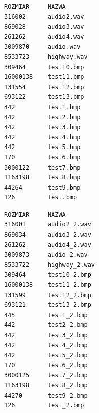 \documentclass[12pt,a4paper,notitlepage]{report}
\begin{document}
\begin{minipage}{.48\textwidth}
\begin{lstlisting}[language=bash,caption={Przedstawienie plików przed kompresją.}]
ROZMIAR		NAZWA
316002		audio2.wav
869028		audio3.wav
261262		audio4.wav
3009870		audio.wav
8533723		highway.wav
309464		test10.bmp
16000138	test11.bmp
131554		test12.bmp
693122		test13.bmp
442			test1.bmp
442			test2.bmp
442			test3.bmp
442			test4.bmp
442			test5.bmp
170			test6.bmp
3000122		test7.bmp
1163198		test8.bmp
44264		test9.bmp
126			test.bmp
\end{lstlisting}
\end{minipage}
\hfill
\begin{minipage}{.48\textwidth}
\begin{lstlisting}[language=bash,caption={Przedstawienie plików po dekompresji.}]
ROZMIAR		NAZWA
316001		audio2_2.wav
869034		audio3_2.wav
261262		audio4_2.wav
3009873		audio_2.wav
8533722		highway_2.wav
309464		test10_2.bmp
16000138	test11_2.bmp
131599		test12_2.bmp
693121		test13_2.bmp
445			test1_2.bmp
442			test2_2.bmp
442			test3_2.bmp
442			test4_2.bmp
442			test5_2.bmp
170			test6_2.bmp
3000125		test7_2.bmp
1163198		test8_2.bmp
44270		test9_2.bmp
126			test_2.bmp
\end{lstlisting}
\end{minipage}
\end{document}

